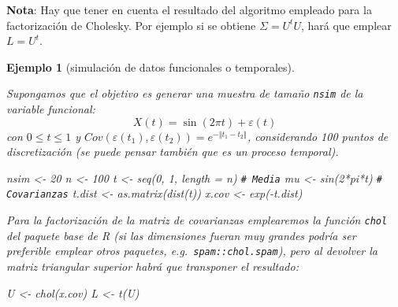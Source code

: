 \documentclass[
  10pt,
]{book}
\newenvironment{Shaded}{\begin{snugshade}}{\end{snugshade}}
\newcommand{\AttributeTok}[1]{\textcolor[rgb]{0.77,0.63,0.00}{#1}}
\newcommand{\CommentTok}[1]{\textcolor[rgb]{0.56,0.35,0.01}{\textit{#1}}}
\newcommand{\DecValTok}[1]{\textcolor[rgb]{0.00,0.00,0.81}{#1}}
\newcommand{\FunctionTok}[1]{\textcolor[rgb]{0.00,0.00,0.00}{#1}}
\newcommand{\NormalTok}[1]{#1}
\newcommand{\OtherTok}[1]{\textcolor[rgb]{0.56,0.35,0.01}{#1}}
\newcommand{\SpecialCharTok}[1]{\textcolor[rgb]{0.00,0.00,0.00}{#1}}
\theoremstyle{break}
\newtheorem{example}{Ejemplo}[chapter]
\theoremstyle{nonumberplain}
\renewcommand{\CommentTok}[1]{\textcolor[rgb]{0.41,0.41,0.41}{\texttt{#1}}}
\begin{document}
\textbf{Nota}: Hay que tener en cuenta el resultado del algoritmo empleado
para la factorización de Cholesky. Por ejemplo si se obtiene \(\Sigma=U^tU\),
hará que emplear \(L=U^t.\)

\begin{example}[simulación de datos funcionales o temporales]
\protect\hypertarget{exm:funcional}{}\label{exm:funcional}

Supongamos que el objetivo es generar una muestra de tamaño \texttt{nsim} de la variable funcional:
\[X(t)= \sin\left(  2\pi t\right)  +\varepsilon\left(  t\right)\]
con \(0\leq t \leq1\) y \(Cov(\varepsilon\left( t_1 \right) , \varepsilon\left( t_2 \right) ) = e^{-\left\Vert t_1-t_2 \right\Vert }\),
considerando 100 puntos de discretización (se puede pensar también que es un proceso temporal).

\begin{Shaded}
\begin{Highlighting}[]
\NormalTok{nsim }\OtherTok{\textless{}{-}} \DecValTok{20}
\NormalTok{n }\OtherTok{\textless{}{-}} \DecValTok{100}
\NormalTok{t }\OtherTok{\textless{}{-}} \FunctionTok{seq}\NormalTok{(}\DecValTok{0}\NormalTok{, }\DecValTok{1}\NormalTok{, }\AttributeTok{length =}\NormalTok{ n)}
\CommentTok{\# Media}
\NormalTok{mu }\OtherTok{\textless{}{-}} \FunctionTok{sin}\NormalTok{(}\DecValTok{2}\SpecialCharTok{*}\NormalTok{pi}\SpecialCharTok{*}\NormalTok{t)}
\CommentTok{\# Covarianzas}
\NormalTok{t.dist }\OtherTok{\textless{}{-}} \FunctionTok{as.matrix}\NormalTok{(}\FunctionTok{dist}\NormalTok{(t))}
\NormalTok{x.cov }\OtherTok{\textless{}{-}} \FunctionTok{exp}\NormalTok{(}\SpecialCharTok{{-}}\NormalTok{t.dist)}
\end{Highlighting}
\end{Shaded}

Para la factorización de la matriz de covarianzas emplearemos la función \texttt{chol}
del paquete base de R (si las dimensiones fueran muy grandes podría ser preferible emplear
otros paquetes, e.g.~\texttt{spam::chol.spam}), pero al devolver la matriz triangular superior
habrá que transponer el resultado:

\begin{Shaded}
\begin{Highlighting}[]
\NormalTok{U }\OtherTok{\textless{}{-}} \FunctionTok{chol}\NormalTok{(x.cov)}
\NormalTok{L }\OtherTok{\textless{}{-}} \FunctionTok{t}\NormalTok{(U)}
\end{Highlighting}
\end{Shaded}


\end{example}
\end{document}
